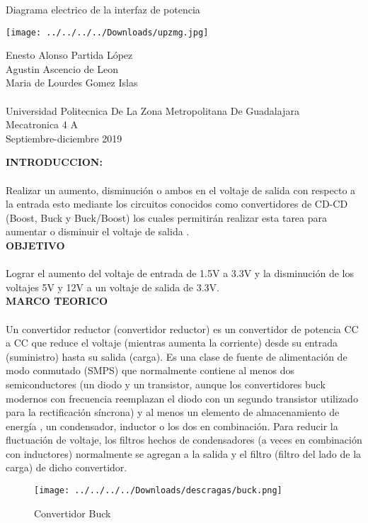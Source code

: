 \documentclass[12pt]{report}
\begin{document}
 
\begin{center}
{\Huge Diagrama electrico de la interfaz de potencia}
\end{center}
\begin{center}
\texttt{[image: ../../../../Downloads/upzmg.jpg]} 
\end{center} 
{\Huge Enesto Alonso Partida López\\Agustin Ascencio de Leon\\Maria de Lourdes Gomez Islas\\ \\Universidad Politecnica De La Zona Metropolitana De Guadalajara\\ Mecatronica 4 A\\ Septiembre-diciembre 2019}
\date{  de noviembre  2019}
 
\newpage

{\huge \textbf{INTRODUCCION:}\\}\\


{\large Realizar un aumento, disminución o ambos en el voltaje de salida con respecto a la entrada esto mediante los circuitos conocidos como convertidores de CD-CD (Boost, Buck y Buck/Boost) los cuales permitirán realizar esta tarea para aumentar o disminuir el voltaje de salida .}\\
 

{\huge \textbf{OBJETIVO}\\}\\


{\large Lograr el aumento del voltaje de entrada de 1.5V a 3.3V y la disminución de los voltajes 5V y 12V a un voltaje de salida de 3.3V.}\\



{\huge \textbf{MARCO TEORICO}\\}\\


{\large Un convertidor reductor (convertidor reductor) es un convertidor de potencia CC a CC que reduce el voltaje (mientras aumenta la corriente) desde su entrada (suministro) hasta su salida (carga). Es una clase de fuente de alimentación de modo conmutado (SMPS) que normalmente contiene al menos dos semiconductores (un diodo y un transistor, aunque los convertidores buck modernos con frecuencia reemplazan el diodo con un segundo transistor utilizado para la rectificación síncrona) y al menos un elemento de almacenamiento de energía , un condensador, inductor o los dos en combinación. Para reducir la fluctuación de voltaje, los filtros hechos de condensadores (a veces en combinación con inductores) normalmente se agregan a la salida y el filtro (filtro del lado de la carga) de dicho convertidor.}
\begin{center}
\begin{figure}[hbtp]
\caption{Convertidor Buck}
\centering
\texttt{[image: ../../../../Downloads/descragas/buck.png]}
\end{figure}

\end{center}
\end{document}
